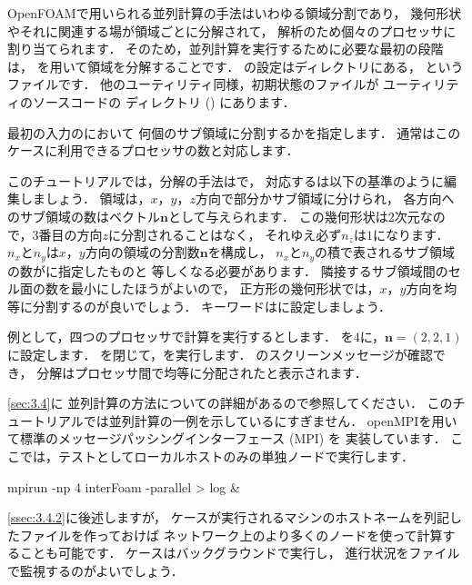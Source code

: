 OpenFOAMで用いられる並列計算の手法はいわゆる領域分割であり，
幾何形状やそれに関連する場が領域ごとに分解されて，
解析のため個々のプロセッサに割り当てられます．
そのため，並列計算を実行するために必要な最初の段階は，
を用いて領域を分解することです．
の設定はディレクトリにある，
というファイルです．
他のユーティリティ同様，初期状態のファイルが
ユーティリティのソースコードの
ディレクトリ () にあります．

最初の入力のにおいて
何個のサブ領域に分割するかを指定します．
通常はこのケースに利用できるプロセッサの数と対応します．

このチュートリアルでは，分解の手法はで，
対応するは以下の基準のように編集しましょう．
領域は，$x$，$y$，$z$方向で部分かサブ領域に分けられ，
各方向へのサブ領域の数はベクトル$\bm{n}$として与えられます．
この幾何形状は2次元なので，3番目の方向$z$に分割されることはなく，
それゆえ必ず$n_{z}$は$1$になります．
$n_{x}$と$n_{y}$は$x$，$y$方向の領域の分割数$\bm{n}$を構成し，
$n_{x}$と$n_{y}$の積で表されるサブ領域の数がに指定したものと
等しくなる必要があります．
隣接するサブ領域間のセル面の数を最小にしたほうがよいので，
正方形の幾何形状では，$x$，$y$方向を均等に分割するのが良いでしょう．
キーワードはに設定しましょう．

例として，四つのプロセッサで計算を実行するとします．
を4に，$\bm{n} = (2, 2, 1)$に設定します．
を閉じて，を実行します．
のスクリーンメッセージが確認でき，
分解はプロセッサ間で均等に分配されたと表示されます．

\autoref{sec:3.4}に
並列計算の方法についての詳細があるので参照してください．
このチュートリアルでは並列計算の一例を示しているにすぎません．
openMPIを用いて標準のメッセージパッシングインターフェース (MPI) を
実装しています．
ここでは，テストとしてローカルホストのみの単独ノードで実行します．
\begin{OFverbatim}[terminal]
mpirun -np 4 interFoam -parallel > log &
\end{OFverbatim}
\autoref{ssec:3.4.2}に後述しますが，
ケースが実行されるマシンのホストネームを列記したファイルを作っておけば
ネットワーク上のより多くのノードを使って計算することも可能です．
ケースはバックグラウンドで実行し，
進行状況をファイルで監視するのがよいでしょう．


